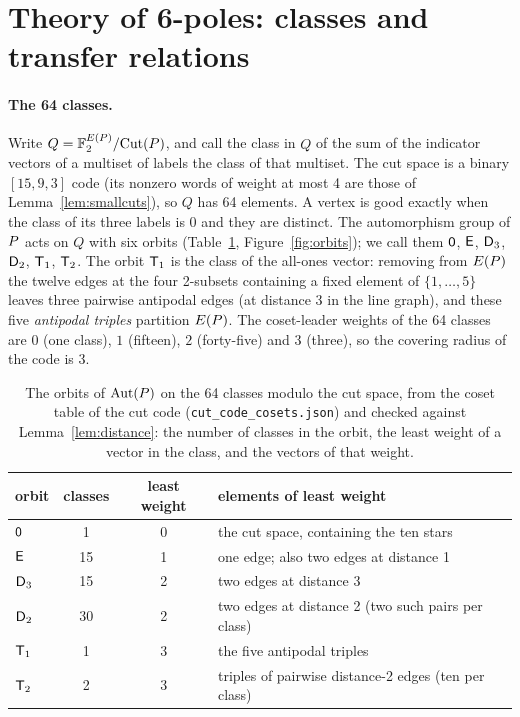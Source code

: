 \section{Theory of 6-poles: classes and transfer relations}\label{sec:theory6}

\paragraph{The 64 classes.} Write $Q = \mathbb{F}_2^{E(P)}/\mathrm{Cut}(P)$, and call the class in $Q$ of
the sum of the indicator vectors of a multiset of labels the class of that multiset. The cut space
is a binary $[15, 9, 3]$ code (its nonzero words of weight at most 4 are those of
Lemma~\ref{lem:smallcuts}), so $Q$ has 64 elements. A vertex is good exactly when the class of its
three labels is $0$ and they are distinct. The automorphism group of $P$ acts on $Q$ with six
orbits (Table~\ref{tab:classes}, Figure~\ref{fig:orbits}); we call them $\mathsf{0}$, $\mathsf{E}$, $\mathsf{D}_3$,
$\mathsf{D}_2$, $\mathsf{T}_1$, $\mathsf{T}_2$. The orbit $\mathsf{T}_1$ is the class of the
all-ones vector: removing from $E(P)$ the twelve edges at the four 2-subsets containing a fixed
element of $\{1, \dots, 5\}$ leaves three pairwise antipodal edges (at distance 3 in the line graph),
and these five \emph{antipodal triples} partition $E(P)$. The coset-leader weights of the 64 classes are
$0$ (one class), $1$ (fifteen), $2$ (forty-five) and $3$ (three), so the covering radius of the code is 3.

\begin{table}[t]\centering\small
\begin{tabular}{lccl}
\toprule
orbit & classes & least weight & elements of least weight \\
\midrule
$\mathsf{0}$ & 1 & 0 & the cut space, containing the ten stars \\
$\mathsf{E}$ & 15 & 1 & one edge; also two edges at distance 1 \\
$\mathsf{D}_3$ & 15 & 2 & two edges at distance 3 \\
$\mathsf{D}_2$ & 30 & 2 & two edges at distance 2 (two such pairs per class) \\
$\mathsf{T}_1$ & 1 & 3 & the five antipodal triples \\
$\mathsf{T}_2$ & 2 & 3 & triples of pairwise distance-2 edges (ten per class) \\
\bottomrule
\end{tabular}
\caption{The orbits of $\mathrm{Aut}(P)$ on the 64 classes modulo the cut space, from the coset table of the cut code
(\texttt{cut\_code\_cosets.json}) and checked against Lemma~\ref{lem:distance}: the number of classes in the orbit, the least
weight of a vector in the class, and the vectors of that weight.}\label{tab:classes}
\end{table}

